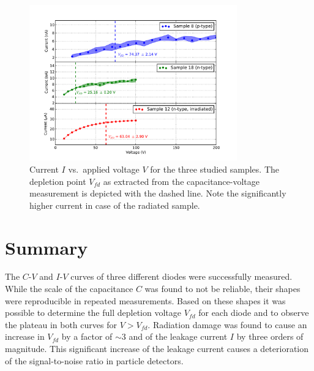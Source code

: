 \documentclass[11pt,a4paper]{report}
\begin{document}
\begin{figure}
  \centering
  \includegraphics[width=0.8\textwidth]{./figures/iv.pdf}
  \caption{Current $I$ vs.\ applied voltage $V$ for the three studied samples. The depletion point $V_{fd}$ as extracted from the capacitance-voltage measurement is depicted with the dashed line. Note the significantly higher current in case of the radiated sample.}\label{fig:iv}
\end{figure}



\section*{Summary}
\label{sec:summary}

The $C$-$V$ and $I$-$V$ curves of three different diodes were successfully measured.
While the scale of the capacitance $C$ was found to not be reliable, their shapes were reproducible in repeated measurements.
Based on these shapes it was possible to determine the full depletion voltage $V_{fd}$ for each diode and to observe the plateau in both curves for $V>V_{fd}$.
Radiation damage was found to cause an increase in $V_{fd}$ by a factor of $\sim 3$ and of the leakage current $I$ by three orders of magnitude.
This significant increase of the leakage current causes a deterioration of the signal-to-noise ratio in particle detectors.

\printbibliography
\end{document}
